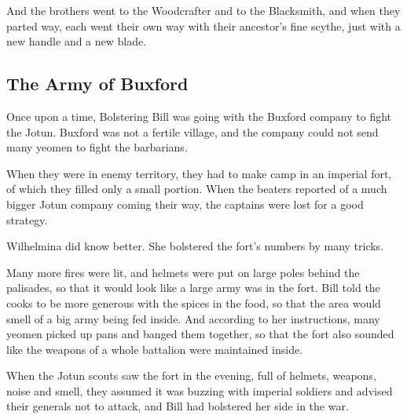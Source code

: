\documentclass[twoside,11pt,b5paper,twocolumn]{scrbook}
\begin{document}
And the brothers went to the Woodcrafter and to the Blacksmith, and when they parted way, each went their own way with their ancestor's fine scythe, just with a new handle and a new blade.


\subsection{The Army of Buxford}
Once upon a time, Bolstering Bill was going with the Buxford company to fight the Jotun. Buxford was not a fertile village, and the company could not send many yeomen to fight the barbarians.

When they were in enemy territory, they had to make camp in an imperial fort, of which they filled only a small portion. When the beaters reported of a much bigger Jotun company coming their way, the captains were lost for a good strategy.

Wilhelmina did know better. She bolstered the fort's numbers by many tricks.

Many more fires were lit, and helmets were put on large poles behind the palisades, so that it would look like a large army was in the fort.
Bill told the cooks to be more generous with the spices in the food, so that the area would smell of a big army being fed inside.
And according to her instructions, many yeomen picked up pans and banged them together, so that the fort also sounded like the weapons of a whole battalion were maintained inside.

When the Jotun scouts saw the fort in the evening, full of helmets, weapons, noise and smell, they assumed it was buzzing with imperial soldiers and advised their generals not to attack, and Bill had bolstered her side in the war.
\end{document}

